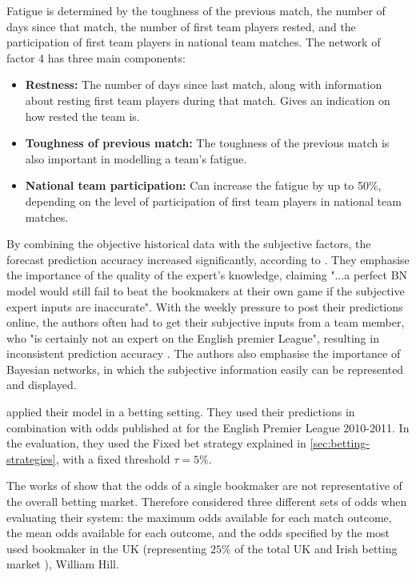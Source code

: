Fatigue is determined by the toughness of the previous match, the number of days since that match, the number of first team players rested, and the participation of first team players in national team matches. The network of factor 4 has three main components:
\begin{itemize}
    \item \textbf{Restness:} The number of days since last match, along with information about resting first team players during that match. Gives an indication on how rested the team is.
    \item \textbf{Toughness of previous match:} The toughness of the previous match is also important in modelling a team's fatigue.
    \item \textbf{National team participation:} Can increase the fatigue by up to 50\%, depending on the level of participation of first team players in national team matches.
\end{itemize}

By combining the objective historical data with the subjective factors, the forecast prediction accuracy increased significantly, according to \citet{bib:constantinou-fenton-neil-2012}. They emphasise the importance of the quality of the expert's knowledge, claiming "...a perfect BN model would still fail to beat the bookmakers at their own game if the subjective expert inputs are inaccurate". With the weekly pressure to post their predictions online, the authors often had to get their subjective inputs from a team member, who "is certainly not an expert on the English premier League", resulting in inconsistent prediction accuracy \citep{bib:constantinou-fenton-neil-2012}. The authors also emphasise the importance of Bayesian networks, in which the subjective information easily can be represented and displayed.

\citet{bib:constantinou-fenton-neil-2012} applied their model in a betting setting. They used their predictions in combination with odds published at \citet{bib:football-data} for the English Premier League 2010-2011. In the evaluation, they used the Fixed bet strategy explained in \cref{sec:betting-strategies}, with a fixed threshold $\tau = 5\%$. 

The works of \citet{bib:constantinou-fenton-2013} show that the odds of a single bookmaker are not representative of the overall betting market. Therefore \citet{bib:constantinou-fenton-neil-2012} considered three different sets of odds when evaluating their system: the maximum odds available for each match outcome, the mean odds available for each outcome, and the odds specified by the most used bookmaker in the UK (representing $25\%$ of the total UK and Irish betting market \citep{bib:constantinou-fenton-neil-2012}), William Hill.

